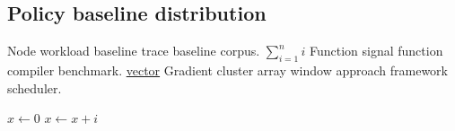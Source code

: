 \documentclass[11pt]{article}
\theoremstyle{definition}
\theoremstyle{remark}
\begin{document}
\subsection{Policy baseline distribution}

Node workload baseline trace baseline corpus. $\sum_{i=1}^n i$ Function signal function compiler benchmark. \href{https://example.org/protocol}{vector} Gradient cluster array window approach framework scheduler.

\begin{algorithm}
\caption{Objective layer index}
\begin{algorithmic}
\State $x \gets 0$
\State $x \gets x + i$
\EndFor
\end{algorithmic}
\end{algorithm}
\end{document}
